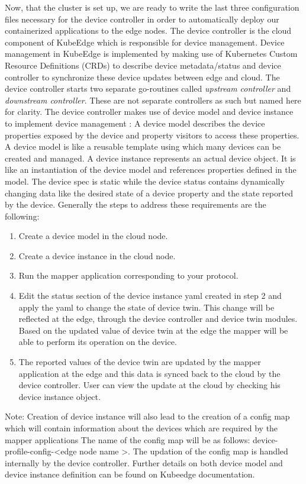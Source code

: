 Now, that the cluster is set up, we are ready to write the last three configuration files necessary for the device controller in order to automatically deploy our containerized applications to the edge nodes.
The device controller is the cloud component of KubeEdge which is responsible for device management. Device management in KubeEdge is implemented by making use of Kubernetes Custom Resource Definitions (CRDs) to describe device metadata/status and device controller to synchronize these device updates between edge and cloud. The device controller starts two separate go-routines called \textit{upstream controller} and \textit{downstream controller}. These are not separate controllers as such but named here for clarity.
The device controller makes use of device model and device instance to implement device management :
A device model describes the device properties exposed by the device and property visitors to access these properties. A device model is like a reusable template using which many devices can be created and managed. A device instance represents an actual device object. It is like an instantiation of the device model and references properties defined in the model. The device spec is static while the device status contains dynamically changing data like the desired state of a device property and the state reported by the device.
Generally the steps to address these requirements are the following:
\begin{enumerate}
	\item Create a device model in the cloud node.
	\item Create a device instance in the cloud node.
	\item Run the mapper application corresponding to your protocol.
	\item Edit the status section of the device instance yaml created in step 2 and apply the yaml to change the state of device twin. This change will be reflected at the edge, through the device controller and device twin modules. Based on the updated value of device twin at the edge the mapper will be able to perform its operation on the device.
	\item The reported values of the device twin are updated by the mapper application at the edge and this data is synced back to the cloud by the device controller. User can view the update at the cloud by checking his device instance object.
\end{enumerate}

Note: Creation of device instance will also lead to the creation of a config map which will contain information about the devices which are required by the mapper applications The name of the config map will be as follows: device-profile-config-\textless edge node name \textgreater. The updation of the config map is handled internally by the device controller.
Further details on both device model and device instance definition can be found on Kubeedge documentation.

